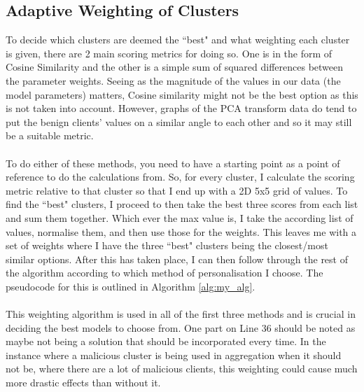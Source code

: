 \subsection{Adaptive Weighting of Clusters}
To decide which clusters are deemed the ``best" and what weighting each cluster is given, there are 2 main scoring metrics for doing so.
One is in the form of Cosine Similarity and the other is a simple sum of squared differences between the parameter weights.
Seeing as the magnitude of the values in our data (the model parameters) matters, Cosine similarity might not be the best option as this is not taken into account.
However, graphs of the PCA transform data do tend to put the benign clients' values on a similar angle to each other and so it may still be a suitable metric.
\\ \\
To do either of these methods, you need to have a starting point as a point of reference to do the calculations from.
So, for every cluster, I calculate the scoring metric relative to that cluster so that I end up with a 2D 5x5 grid of values.
To find the ``best" clusters, I proceed to then take the best three scores from each list and sum them together.
Which ever the max value is, I take the according list of values, normalise them, and then use those for the weights.
This leaves me with a set of weights where I have the three ``best" clusters being the closest/most similar options.
After this has taken place, I can then follow through the rest of the algorithm according to which method of personalisation I choose.
The pseudocode for this is outlined in Algorithm \ref{alg:my_alg}.
\\ \\
This weighting algorithm is used in all of the first three methods and is crucial in deciding the best models to choose from.
One part on Line 36 should be noted as maybe not being a solution that should be incorporated every time.
In the instance where a malicious cluster is being used in aggregation when it should not be, where there are a lot of malicious clients, this weighting could cause much more drastic effects than without it.
\\ \\


